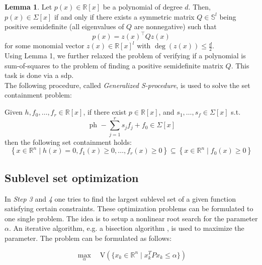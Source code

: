 \documentclass[10pt,a4paper]{article}
\begin{document}
\textbf{Lemma 1}. Let $p(x) \in \mathbb{R}[x]$ be a polynomial of degree $d$. Then, $p(x) \in \Sigma[x]$ if and only if there exists a symmetric
matrix $Q \in \mathbb{S}^l$ being positive semidefinite (all eigenvalues of $Q$ are nonnegative) such that
\begin{equation}
	p(x)=z(x)^{\top} Q z(x)
\end{equation}
for some monomial vector $z(x) \in \mathbb{R}[x]^l$ with $\operatorname{deg}(z(x)) \leq \frac{d}{2}$.\\

Using Lemma 1, we further relaxed the problem of verifying if a polynomial is sum-of-squares to the problem of finding a positive semidefinite matrix $Q$.
This task is done via a \gls{sdp}. \\


The following procedure, called \textit{Generalized S-procedure}, is used to solve the set containment problem:

\begin{tcolorbox}[colback=gray!20, colframe=gray!80,title=Generalized S-procedure \cite{cunis_loureiro2023},arc=0.2mm]        
Given $h, f_0, \ldots, f_r \in \mathbb{R}[x]$, if there exist $p \in \mathbb{R}[x]$, and $s_1, \ldots, s_f \in \Sigma[x]$ s.t.
\begin{equation}
	\text { ph }-\sum_{j=1}^r s_j f_j+f_0 \in \Sigma[x]
\end{equation}
then the following set containment holds:
\begin{equation}
	\left\{x \in \mathbb{R}^n \mid h(x)=0, f_1(x) \geq 0, \ldots, f_r(x) \geq 0\right\} \subseteq\left\{x \in \mathbb{R}^n \mid f_0(x) \geq 0\right\}
\end{equation}
\end{tcolorbox}


\subsection{Sublevel set optimization}
In \textit{Step 3} and \textit{4} one tries to find the largest sublevel set of a given function satisfying certain constraints. These optimization problems
can be formulated to one single problem. The idea is to setup a nonlinear root search for the parameter $\alpha$. An iterative 
algorithm, e.g. a bisection algorithm , is used to maximize the parameter. The problem can be formulated as follows:

\begin{equation}
\label{eq:sos_problem}
\max\limits_{\alpha} \quad \text{V}\left(\{x_k \in \mathbb{R}^n \mid x_k^TPx_k \leq \alpha \}\right)
\end{equation}
\end{document}
